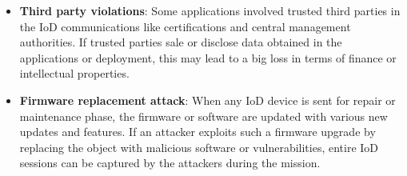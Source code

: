 \documentclass{easychair}
\begin{document}
\begin{enumerate}
\begin{itemize}
      \item \textbf{Third party violations}: Some applications involved trusted third parties in the IoD communications like certifications and central management authorities. If trusted parties sale or disclose data obtained in the applications or deployment, this may lead to a big loss in terms of finance or intellectual properties.

      \item \textbf{Firmware replacement attack}: When any IoD device is sent for repair or maintenance phase, the firmware or software are updated with various new updates and features. If an attacker exploits such a firmware upgrade by replacing the object with malicious software or vulnerabilities, entire IoD sessions can be captured by the attackers during the mission.

 \end{itemize}
\end{enumerate}
\end{document}
